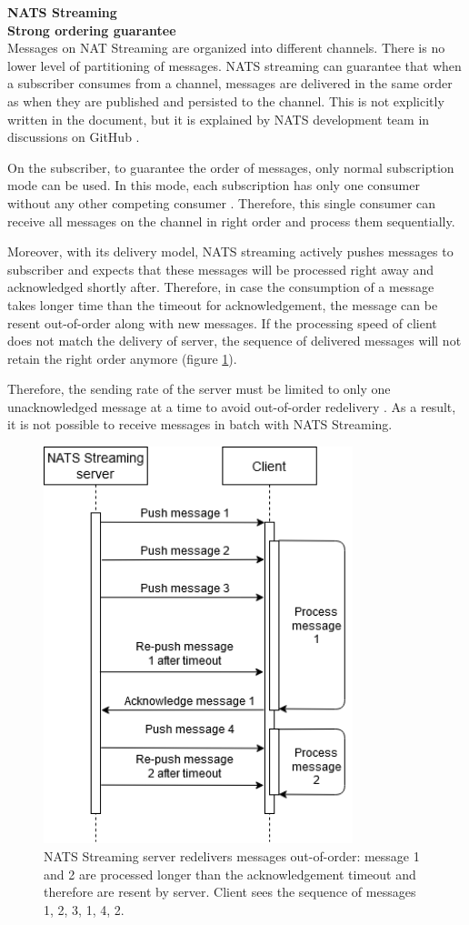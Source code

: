 \large \textbf{NATS Streaming}\\
\normalsize
\textbf{Strong ordering guarantee}\\
Messages on NAT Streaming are organized into different channels. There is no lower level of partitioning of messages. NATS streaming can guarantee that when a subscriber consumes from a channel, messages are delivered in the same order as when they are published and persisted to the channel. This is not explicitly written in the document, but it is explained by NATS development team in discussions on GitHub \cite{natsorder}.

On the subscriber, to guarantee the order of messages, only normal subscription mode can be used. In this mode, each subscription has only one consumer without any other competing consumer \cite{natsconceptchannels}. Therefore, this single consumer can receive all messages on the channel in right order and process them sequentially.

Moreover, with its delivery model, NATS streaming actively pushes messages to subscriber and expects that these messages will be processed right away and acknowledged shortly after. Therefore, in case the consumption of a message takes longer time than the timeout for acknowledgement, the message can be resent out-of-order along with new messages. If the processing speed of client does not match the delivery of server, the sequence of delivered messages will not retain the right order anymore (figure \ref{fig:ordernats}).


Therefore, the sending rate of the server must be limited to only one unacknowledged message at a time to avoid out-of-order redelivery \cite{natsdevelopingacks}. As a result, it is not possible to receive messages in batch with NATS Streaming. 

\begin{figure}[h]
	\centering
	\includegraphics[width=9cm]{images/order-nats.png}
	\caption{NATS Streaming server redelivers messages out-of-order: message 1 and 2 are processed longer than the acknowledgement timeout and therefore are resent by server. Client sees the sequence of messages 1, 2, 3, 1, 4, 2.}
	\label{fig:ordernats}
\end{figure}

